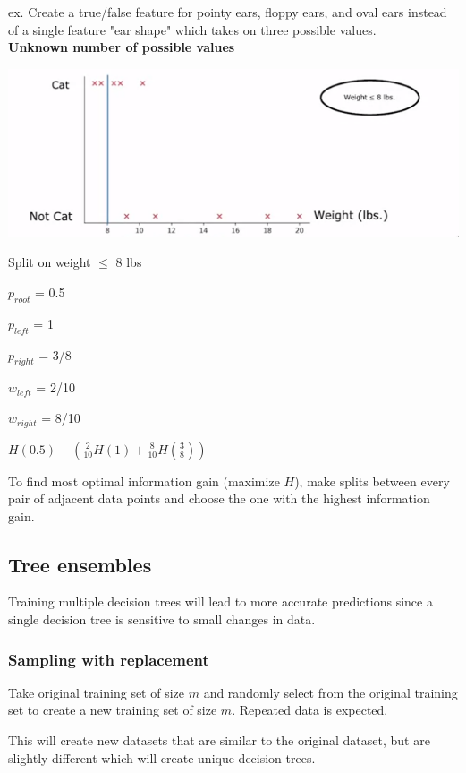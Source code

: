 \documentclass[12pt]{article}
\begin{document}
ex. Create a true/false feature for pointy ears, floppy ears, and oval ears instead of a single
feature "ear shape" which takes on three possible values.\\

\textbf{Unknown number of possible values}

\includegraphics[scale=.7]{continuous-tree}

Split on weight $\le$ 8 lbs

$p_{root}$ = 0.5

$p_{left}$ = 1

$p_{right}$ = 3/8

$w_{left}$ = 2/10

$w_{right}$ = 8/10

$H(0.5) - (\frac{2}{10} H(1) + \frac{8}{10} H(\frac{3}{8}))$

To find most optimal information gain (maximize $H$), make splits between every pair of adjacent data points and choose
the one with the highest information gain.

\subsection{Tree ensembles}

Training multiple decision trees will lead to more accurate predictions since
a single decision tree is sensitive to small changes in data.

\subsubsection{Sampling with replacement}

Take original training set of size $m$ and randomly select from the original training set to
create a new training set of size $m$. Repeated data is expected.

This will create new datasets that are similar to the original dataset, but are slightly different
which will create unique decision trees.
\end{document}
